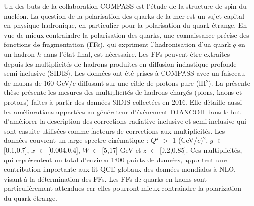 Un des buts de la collaboration COMPASS est l'étude de la structure de spin du nucléon. La question de la polarisation des quarks de la mer est un sujet capital en physique hadronique, en particulier pour la polarisation du quark étrange. En vue de mieux contraindre la polarisation des quarks, une connaissance précise des fonctions de fragmentation (FFs), qui expriment l'hadronisation d'un quark $q$ en un hadron $h$ dans l'état final, est nécessaire. Les FFs peuvent être extraites depuis les multiplicités de hadrons produites en diffusion inélastique profonde semi-inclusive (SIDIS). Les données ont été prises à COMPASS avec un faisceau de muons de 160 GeV/$c$ diffusant sur une cible de protons pure (lH$^2$). La présente thèse présente les mesures des multiplicités de hadrons chargés (pions, kaons et protons) faites à partir des données SIDIS collectées en 2016. Elle détaille aussi les améliorations apportées au générateur d'événement DJANGOH dans le but d'améliorer la description des corrections radiative inclusive et semi-inclusive qui sont ensuite utilisées comme facteurs de corrections aux multiplicités. Les données couvrent un large spectre cinématique : $Q^2$ $>$ 1 (GeV/$c$)$^2$, $y$ $\in$ [0.1,0.7], $x$ $\in$ [0.004,0.4], $W$ $\in$ [5,17] GeV et $z$ $\in$ [0.2,0.85]. Ces multiplicités, qui représentent un total d'environ 1800 points de données, apportent une contribution importante aux fit QCD globaux des données mondiales à NLO, visant à la détermination des FFs. Les FFs de quarks en kaons sont particulièrement attendues car elles pourront mieux contraindre la polarization du quark étrange.


